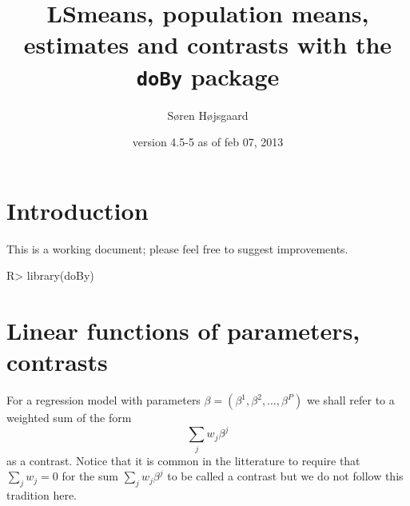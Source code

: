 \documentclass[11pt]{article}
\title{LSmeans, population means, estimates and contrasts  with the \texttt{doBy} package}
\author{S{\o}ren H{\o}jsgaard}
\date{\pkg{doBy} version 4.5-5 as of feb 07, 2013}
\def\code#1{\texttt{#1}}
\def\esticon{\code{esticon()}}
\begin{document}
\renewenvironment{Schunk}{\begin{center}
    \scriptsize
    \begin{boxedminipage}{1.0\textwidth}}{
    \end{boxedminipage}\end{center}}


\maketitle
\tableofcontents

\parindent0pt\parskip5pt

{}


\section{Introduction}
\label{sec:xxx}

This is a working document; please feel free to suggest improvements.

\begin{Schunk}
\begin{Sinput}
R> library(doBy)
\end{Sinput}
\end{Schunk}

\section{Linear functions of parameters, contrasts}
\label{sec:line-funct-param}

For a regression model with parameters $\beta=(\beta^1, \beta^2,\dots,
\beta^P)$ we shall refer to a weighted sum of the form
\begin{displaymath}
  \sum_j w_j \beta^j
\end{displaymath}
as a contrast. Notice that it is common in the litterature to require
that $\sum_j w_j=0$ for the sum $\sum_j w_j \beta^j$ to be called a
contrast but we do not follow this tradition here.


\end{document}
